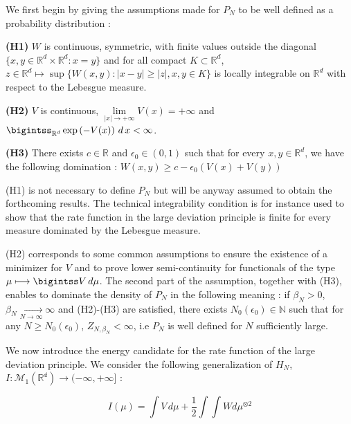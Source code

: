 \documentclass[a4paper,12pt]{report}
\begin{document}
We first begin by giving the assumptions made for $P_{N}$ to be well defined as a probability distribution : 
\vspace{0.5cm}

\textbf{(H1)} $W$ is continuous, symmetric, with finite values outside the diagonal $\{x, y \in \mathbb{R}^{d} \times \mathbb{R}^{d} : x = y\}$ and for all compact $K \subset \mathbb{R}^{d}$, $z\in \mathbb{R}^{d} \longmapsto \sup\{W(x, y) : \lvert x - y \rvert \geq \lvert z \rvert, x, y \in K\}$ is locally integrable on $\mathbb{R}^{d}$ with respect to the Lebesgue measure.
\vspace{0.5cm}

\textbf{(H2)}  $V$ is continuous, $\underset{\lvert x \rvert \longrightarrow + \infty}{\lim} V(x) = +\infty$ and $\bigintss_{\mathbb{R}^{d}} \exp\left(-V(x)\right)\,d\,x < \infty$.
\vspace{0.5cm}

\textbf{(H3)} There exists $c\in \mathbb{R}$ and $\epsilon_0 \in (0, 1)$ such that for every $x, y \in \mathbb{R}^{d}$, we have the following domination : $W(x, y) \geq c - \epsilon_0 (V(x) + V(y))$
\vspace{0.5cm}

(H1) is not necessary to define $P_{N}$ but will be anyway assumed to obtain the forthcoming results. The technical integrability condition is for instance used to show that the rate function in the large deviation principle is finite for every measure dominated by the Lebesgue measure.

(H2) corresponds to some common assumptions to ensure the existence of a minimizer for $V$ and to prove lower semi-continuity for functionals of the type $\mu \longmapsto \bigintss V\,d\mu$. The second part of the assumption, together with (H3), enables to dominate the density of $P_{N}$ in the following meaning : if $\beta_{N} > 0$, $\beta_{N} \underset{N \longrightarrow \infty}{\longrightarrow} \infty$ and (H2)-(H3) are satisfied, there exists $N_{0}(\epsilon_{0}) \in \mathbb{N}$ such that for any $N \geq N_0(\epsilon_0)$, $Z_{N, \beta_{N}} < \infty$, i.e $P_{N}$ is well defined for $N$ sufficiently large. 
\vspace{0.5cm}

We now introduce the energy candidate for the rate function of the large deviation principle. We consider the following generalization of $H_{N}$, $I : \mathcal{M}_{1}(\mathbb{R^{d}}) \longrightarrow (- \infty, + \infty ]$ :

\[I (\mu) = \int V\,d\mu + \frac{1}{2} \int \int W d\mu^{\otimes 2}\]
\end{document}
